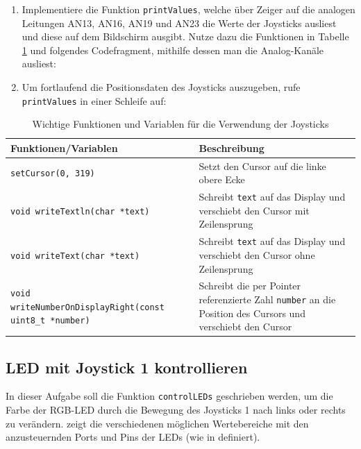 \begin{enumerate}
\item
Implementiere die Funktion \lstinline|printValues|, welche über Zeiger auf die analogen Leitungen AN13, AN16, AN19 und AN23 die Werte der Joysticks ausliest und diese auf dem Bildschirm ausgibt.  
Nutze dazu die Funktionen in Tabelle \ref{tab:joystickInfo} und folgendes Codefragment, mithilfe dessen man die Analog-Kanäle ausliest:


\item 
Um fortlaufend die Positionsdaten des Joysticks auszugeben, rufe \lstinline|printValues| in einer Schleife auf:

\end{enumerate}

\begin{table}[!htb]
    \centering
    \caption{Wichtige Funktionen und Variablen für die Verwendung der Joysticks}
    \label{tab:joystickInfo}
    \begin{tabular}{p{7cm}p{7cm}}
        \toprule
        \textbf{Funktionen/Variablen} & \textbf{Beschreibung} \\
        \midrule
        \lstinline|setCursor(0, 319)| & Setzt den Cursor auf die linke obere Ecke\\
        \lstinline|void writeTextln(char *text)| & Schreibt \lstinline|text| auf das Display und verschiebt den Cursor mit Zeilensprung \\
        \lstinline|void writeText(char *text)| & Schreibt \lstinline|text| auf das Display und verschiebt den Cursor ohne Zeilensprung \\
        \lstinline|void writeNumberOnDisplayRight(const uint8_t *number)| & Schreibt die per Pointer referenzierte Zahl \lstinline|number| an die Position des Cursors und verschiebt den Cursor\\
        \bottomrule
    \end{tabular}
\end{table}


\subsection{LED mit Joystick 1 kontrollieren}
In dieser Aufgabe soll die Funktion \lstinline|controlLEDs| geschrieben werden, um die Farbe der RGB-LED durch die Bewegung des Joysticks 1 nach links oder rechts zu verändern.
 zeigt die verschiedenen möglichen Wertebereiche mit den anzusteuernden Ports und Pins der LEDs (wie in  definiert).

